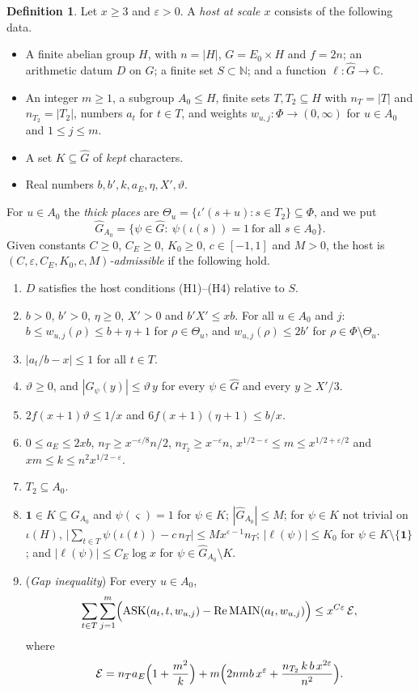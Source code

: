 \documentclass[11pt]{amsart}
\newcommand{\CC}{\mathbb{C}}
\newcommand{\N}{\mathbb{N}}
\newcommand{\eps}{\varepsilon}
\newcommand{\re}{\operatorname{Re}}
\newcommand{\ASK}{\mathrm{ASK}}
\newcommand{\MAIN}{\mathrm{MAIN}}
\newcommand{\Gh}{\widehat{G}}
\theoremstyle{plain}
\theoremstyle{definition}
\newtheorem{definition}[theorem]{Definition}
\numberwithin{equation}{section}
\begin{document}
\begin{definition}\label{def:host}
Let $x\ge3$ and $\eps>0$. A \emph{host at scale $x$} consists of the following data.
\begin{itemize}
\item A finite abelian group $H$, with $n=|H|$, $G=E_0\times H$ and $f=2n$; an arithmetic datum
  $D$ on $G$; a finite set $S\subset\N$; and a function $\ell:\Gh\to\CC$.
\item An integer $m\ge1$, a subgroup $A_0\le H$, finite sets $T,T_2\subseteq H$ with $n_T=|T|$ and
  $n_{T_2}=|T_2|$, numbers $a_t$ for $t\in T$, and weights $w_{u,j}:\Phi\to(0,\infty)$ for $u\in A_0$
  and $1\le j\le m$.
\item A set $K\subseteq\Gh$ of \emph{kept} characters.
\item Real numbers $b,b',k,a_E,\eta,X',\vartheta$.
\end{itemize}
For $u\in A_0$ the \emph{thick places} are $\Theta_u=\{\iota'(s+u):s\in T_2\}\subseteq\Phi$, and we put
\[
\Gh_{A_0}=\{\psi\in\Gh:\ \psi(\iota(s))=1\ \text{for all } s\in A_0\}.
\]
Given constants $C\ge0$, $C_E\ge0$, $K_0\ge0$, $c\in[-1,1]$ and $M>0$, the host is
\emph{$(C,\eps,C_E,K_0,c,M)$-admissible} if the following hold.
\begin{enumerate}[label=\textup{(B\arabic*)}, start=0, leftmargin=3.2em]
\item\label{B0} $D$ satisfies the host conditions (H1)--(H4) relative to $S$.
\item\label{B1} $b>0$, $b'>0$, $\eta\ge0$, $X'>0$ and $b'X'\le xb$. For all $u\in A_0$ and $j$:
  $b\le w_{u,j}(\rho)\le b+\eta+1$ for $\rho\in\Theta_u$, and $w_{u,j}(\rho)\le2b'$ for
  $\rho\in\Phi\setminus\Theta_u$.
\item\label{B2} $|a_t/b-x|\le1$ for all $t\in T$.
\item\label{B3} $\vartheta\ge0$, and $|G_\psi(y)|\le\vartheta\,y$ for every $\psi\in\Gh$ and every
  $y\ge X'/3$.
\item\label{B4} $2f(x+1)\vartheta\le1/x$ and $6f(x+1)(\eta+1)\le b/x$.
\item\label{B5} $0\le a_E\le2xb$, $n_T\ge x^{-\eps/8}n/2$, $n_{T_2}\ge x^{-\eps}n$,
  $x^{1/2-\eps}\le m\le x^{1/2+\eps/2}$ and $xm\le k\le n^2x^{1/2-\eps}$.
\item\label{B6} $T_2\subseteq A_0$.
\item\label{B7} $\mathbf 1\in K\subseteq\Gh_{A_0}$ and $\psi(\varsigma)=1$ for $\psi\in K$;
  $|\Gh_{A_0}|\le M$; for $\psi\in K$ not trivial on $\iota(H)$,
  $\bigl|\sum_{t\in T}\psi(\iota(t))-c\,n_T\bigr|\le Mx^{\eps-1}n_T$; $|\ell(\psi)|\le K_0$ for
  $\psi\in K\setminus\{\mathbf 1\}$; and $|\ell(\psi)|\le C_E\log x$ for $\psi\in\Gh_{A_0}\setminus K$.
\item\label{B8} (\emph{Gap inequality}) For every $u\in A_0$,
\[
\sum_{t\in T}\sum_{j=1}^{m}\Bigl(\ASK(a_t,t,w_{u,j})-\re\MAIN(a_t,w_{u,j})\Bigr)\le x^{C\eps}\,\mathcal E,
\]
where
\[
\mathcal E=n_Ta_E\Bigl(1+\frac{m^2}{k}\Bigr)+m\Bigl(2nmb\,x^{\eps}+\frac{n_{T_2}\,k\,b\,x^{2\eps}}{n^2}\Bigr).
\]
\end{enumerate}
\end{definition}
\end{document}
